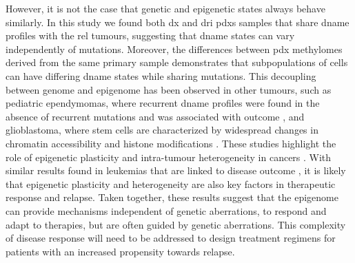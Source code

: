 However, it is not the case that genetic and epigenetic states always behave similarly.
In this study we found both \gls{dx} and \gls{dri} \glspl{pdx} samples that share \gls{dname} profiles with the \gls{rel} tumours, suggesting that \gls{dname} states can vary independently of mutations.
Moreover, the differences between \gls{pdx} methylomes derived from the same primary sample demonstrates that subpopulations of cells can have differing \gls{dname} states while sharing mutations.
This decoupling between genome and epigenome has been observed in other tumours, such as pediatric ependymomas, where recurrent \gls{dname} profiles were found in the absence of recurrent mutations and was associated with outcome \cite{mackEpigenomicAlterationsDefine2014,pajtlerMolecularClassificationEpendymal2015}, and glioblastoma, where stem cells are characterized by widespread changes in chromatin accessibility \cite{guilhamonSinglecellChromatinAccessibility2021} and histone modifications \cite{liauAdaptiveChromatinRemodeling2017}.
These studies highlight the role of epigenetic plasticity and intra-tumour heterogeneity in cancers \cite{flavahanEpigeneticPlasticityHallmarks2017}.
With similar results found in leukemias that are linked to disease outcome \cite{pastoreCorruptedCoordinationEpigenetic2019,landauLocallyDisorderedMethylation2014,gaitiEpigeneticEvolutionLineage2019,namIntegratingGeneticNongenetic2021,liDistinctEvolutionDynamics2016}, it is likely that epigenetic plasticity and heterogeneity are also key factors in therapeutic response and relapse.
Taken together, these results suggest that the epigenome can provide mechanisms independent of genetic aberrations, to respond and adapt to therapies, but are often guided by genetic aberrations.
This complexity of disease response will need to be addressed to design treatment regimens for patients with an increased propensity towards relapse.

